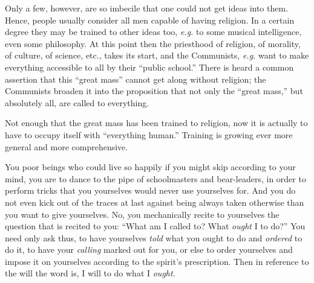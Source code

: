 \documentclass[12pt,a4paper]{book}
\begin{document}
Only a few, however, are so imbecile that one could not get ideas into them. 
Hence, people usually consider all men capable of having religion. In a 
certain degree they may be trained to other ideas too, \textit{e.g.} to some 
musical intelligence, even some philosophy. At this point then the priesthood 
of religion, of morality, of culture, of science, etc., takes its start, and 
the Communists, \textit{e.g.} want to make everything accessible to all by 
their ``public school.'' There is heard a common assertion that this 
``great mass'' cannot get along without religion; the Communists broaden it 
into the proposition that not only the ``great mass,'' but absolutely all, 
are called to everything.

Not enough that the great mass has been trained to religion, now it is 
actually to have to occupy itself with ``everything human.'' Training is 
growing ever more general and more comprehensive.

You poor beings who could live so happily if you might skip according to your 
mind, you are to dance to the pipe of schoolmasters and bear-leaders, in order 
to perform tricks that you yourselves would never use yourselves for. And you 
do not even kick out of the traces at last against being always taken 
otherwise than you want to give yourselves. No, you mechanically recite to 
yourselves the question that is recited to you: ``What am I called to? What 
\textit{ought} I to do?'' You need only ask thus, to have yourselves 
\textit{told} what you ought to do and \textit{ordered} to do it, to have your 
\textit{calling} marked out for you, or else to order yourselves and impose it 
on yourselves according to the spirit's prescription. Then in reference to the 
will the word is, I will to do what I \textit{ought}.
\end{document}
